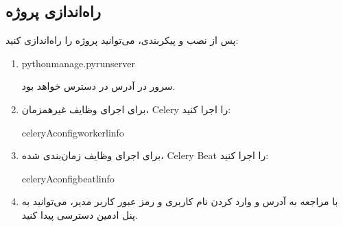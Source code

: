\documentclass[letterpaper,10pt,english]{sphinxmanual}
\begin{document}
\subsection{راه‌اندازی پروژه}
\label{\detokenize{installation/index:id5}}
\sphinxAtStartPar
پس از نصب و پیکربندی، می‌توانید پروژه را راه‌اندازی کنید:
\begin{enumerate}
%
\item {} 
\sphinxAtStartPar
{}

\begin{sphinxVerbatim}[commandchars=\\\{\}]
pythonmanage.pyrunserver
\end{sphinxVerbatim}

\sphinxAtStartPar
سرور در آدرس  در دسترس خواهد بود.

\item {} 
\sphinxAtStartPar
{}

\sphinxAtStartPar
برای اجرای وظایف غیرهمزمان، Celery را اجرا کنید:

\begin{sphinxVerbatim}[commandchars=\\\{\}]
celery\PYGZhy{}Aconfigworker\PYGZhy{}linfo
\end{sphinxVerbatim}

\item {} 
\sphinxAtStartPar
{}

\sphinxAtStartPar
برای اجرای وظایف زمان‌بندی شده، Celery Beat را اجرا کنید:

\begin{sphinxVerbatim}[commandchars=\\\{\}]
celery\PYGZhy{}Aconfigbeat\PYGZhy{}linfo
\end{sphinxVerbatim}

\item {} 
\sphinxAtStartPar
{}

\sphinxAtStartPar
با مراجعه به آدرس  و وارد کردن نام کاربری و رمز عبور کاربر مدیر، می‌توانید به پنل ادمین دسترسی پیدا کنید.

\end{enumerate}
\end{document}
